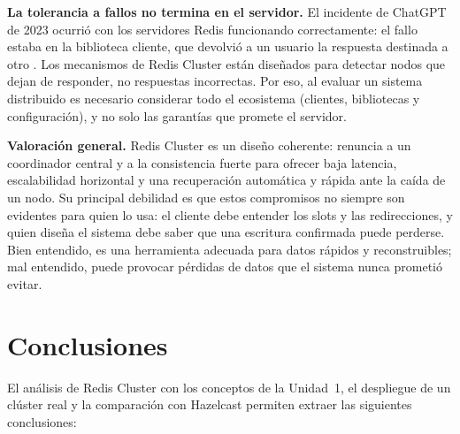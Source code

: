 \documentclass[11pt,a4paper]{article}
\begin{document}
\textbf{La tolerancia a fallos no termina en el servidor.} El incidente de
ChatGPT de 2023 ocurrió con los servidores Redis funcionando correctamente: el
fallo estaba en la biblioteca cliente, que devolvió a un usuario la respuesta
destinada a otro \cite{openai2023outage}. Los mecanismos de Redis Cluster
están diseñados para detectar nodos que dejan de responder, no respuestas
incorrectas. Por eso, al evaluar un sistema distribuido es necesario
considerar todo el ecosistema (clientes, bibliotecas y configuración), y no
solo las garantías que promete el servidor.

\textbf{Valoración general.} Redis Cluster es un diseño coherente: renuncia a
un coordinador central y a la consistencia fuerte para ofrecer baja latencia,
escalabilidad horizontal y una recuperación automática y rápida ante la caída
de un nodo. Su principal debilidad es que estos compromisos no siempre son
evidentes para quien lo usa: el cliente debe entender los slots y las
redirecciones, y quien diseña el sistema debe saber que una escritura
confirmada puede perderse. Bien entendido, es una herramienta adecuada para
datos rápidos y reconstruibles; mal entendido, puede provocar pérdidas de
datos que el sistema nunca prometió evitar.

\section{Conclusiones}
\label{sec:conclusiones}

El análisis de Redis Cluster con los conceptos de la Unidad~1, el
despliegue de un clúster real y la comparación con Hazelcast permiten
extraer las siguientes conclusiones:
\end{document}
